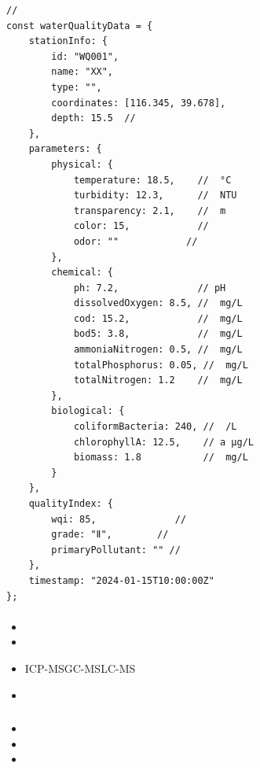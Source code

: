 \begin{lstlisting}[style=javascript]
// 
const waterQualityData = {
    stationInfo: {
        id: "WQ001",
        name: "XX",
        type: "",
        coordinates: [116.345, 39.678],
        depth: 15.5  // 
    },
    parameters: {
        physical: {
            temperature: 18.5,    //  °C
            turbidity: 12.3,      //  NTU
            transparency: 2.1,    //  m
            color: 15,            //  
            odor: ""            // 
        },
        chemical: {
            ph: 7.2,              // pH
            dissolvedOxygen: 8.5, //  mg/L
            cod: 15.2,            //  mg/L
            bod5: 3.8,            //  mg/L
            ammoniaNitrogen: 0.5, //  mg/L
            totalPhosphorus: 0.05, //  mg/L
            totalNitrogen: 1.2    //  mg/L
        },
        biological: {
            coliformBacteria: 240, //  /L
            chlorophyllA: 12.5,    // a μg/L
            biomass: 1.8           //  mg/L
        }
    },
    qualityIndex: {
        wqi: 85,              // 
        grade: "Ⅱ",        // 
        primaryPollutant: "" // 
    },
    timestamp: "2024-01-15T10:00:00Z"
};
\end{lstlisting}

\hypertarget{section-62}{%
\paragraph{}\label{section-62}}

\begin{itemize}
\item
  \important{}
\item
  \important{}
\item
  \important{}ICP-MSGC-MSLC-MS
\item
  \important{}
\end{itemize}

\hypertarget{section-63}{%
\subsubsection{}\label{section-63}}

\hypertarget{section-64}{%
\paragraph{}\label{section-64}}

\begin{itemize}
\item
  \important{}
\item
  \important{}
\item
  \important{}
\end{itemize}

